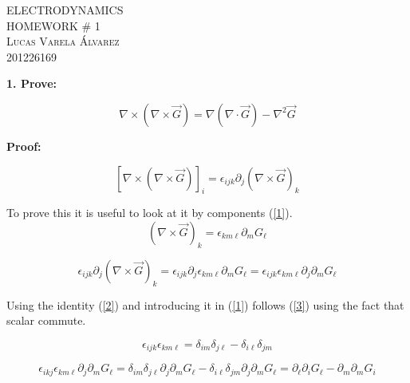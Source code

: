 \documentclass[oneside]{book}
\begin{document}
\begin{center}
\textsc{\LARGE ELECTRODYNAMICS}\\[0.5cm]
\textsc{\LARGE HOMEWORK \# 1}\\[0.5cm]
\textsc{\large Lucas Varela Álvarez \\ 201226169}\\[0.5cm]
\end{center}


\textbf{1. Prove:}


\begin{equation}
\label{0}\nabla \times (\nabla \times \vec{G}) = \nabla (\nabla \cdot \vec{G}) - \nabla^2 \vec{G}
\end{equation}

\textbf{Proof:}

\begin{equation}
\label{1}[\nabla \times (\nabla \times \vec{G})]_i =  \epsilon_{ijk} \partial_j (\nabla \times \vec{G})_k
\end{equation}


To prove this it is useful to look at it by components (\ref{1}).
\begin{equation}
\label{2} (\nabla \times \vec{G})_k = \epsilon_{km\ell} \partial_m G_{\ell}
\end{equation}



\begin{equation}
\label{3}\epsilon_{ijk} \partial_j (\nabla \times \vec{G})_k =  \epsilon_{ijk} \partial_j  \epsilon_{km\ell} \partial_m G_{\ell} = \epsilon_{ijk}  \epsilon_{km\ell}  \partial_j   \partial_m G_{\ell} 
\end{equation}

Using the identity (\ref{2}) and introducing it in (\ref{1}) follows (\ref{3}) using the fact that scalar commute.

\begin{equation}
\label{4}\epsilon_{ijk}  \epsilon_{km\ell} = \delta_{im} \delta_{j\ell} - \delta_{i \ell} \delta_{jm}
\end{equation}




\begin{equation}
\label{5}\epsilon_{ikj}  \epsilon_{km\ell}  \partial_j   \partial_m G_{\ell} = \delta_{im} \delta_{j\ell}  \partial_j   \partial_m G_{\ell} -   \delta_{i \ell} \delta_{jm} \partial_j   \partial_m G_{\ell} = \partial_{\ell} \partial_{i} G_{\ell} - \partial_{m} \partial_{m} G_{i}
\end{equation}
\end{document}
